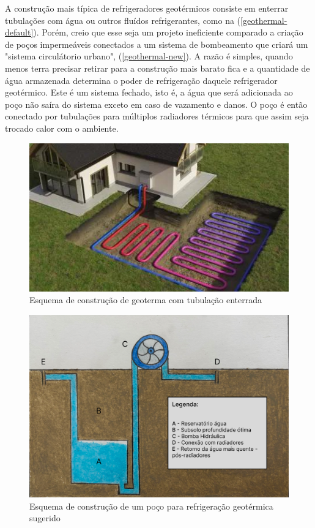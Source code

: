 A construção mais típica de refrigeradores geotérmicos consiste em enterrar tubulações com água ou outros fluídos refrigerantes, como na (\autoref{geothermal-default}). Porém, creio que esse seja um projeto ineficiente comparado a criação de poços impermeáveis conectados a um sistema de bombeamento que criará um "sistema circulátorio urbano", (\autoref{geothermal-new}). A razão é simples, quando menos terra precisar retirar para a construção mais barato fica e a quantidade de água armazenada determina o poder de refrigeração daquele refrigerador geotérmico. Este é um sistema fechado, isto é, a água que será adicionada ao poço não saíra do sistema exceto em caso de vazamento e danos.
O poço é então conectado por tubulações para múltiplos radiadores térmicos para que assim seja trocado calor com o ambiente. 

\begin{figure}[h]
    \centering
    \includegraphics[scale=0.7]{pictures/geoterma-padrao.jpeg}
    \caption{Esquema de construção de geoterma com tubulação enterrada}
    \label{geothermal-default}
\end{figure}

\begin{figure}[htp]
    \centering
    \includegraphics[scale=0.25]{pictures/geoterma.png}
    \caption{Esquema de construção de um poço para refrigeração geotérmica sugerido}
    \label{geothermal-new}
\end{figure}


